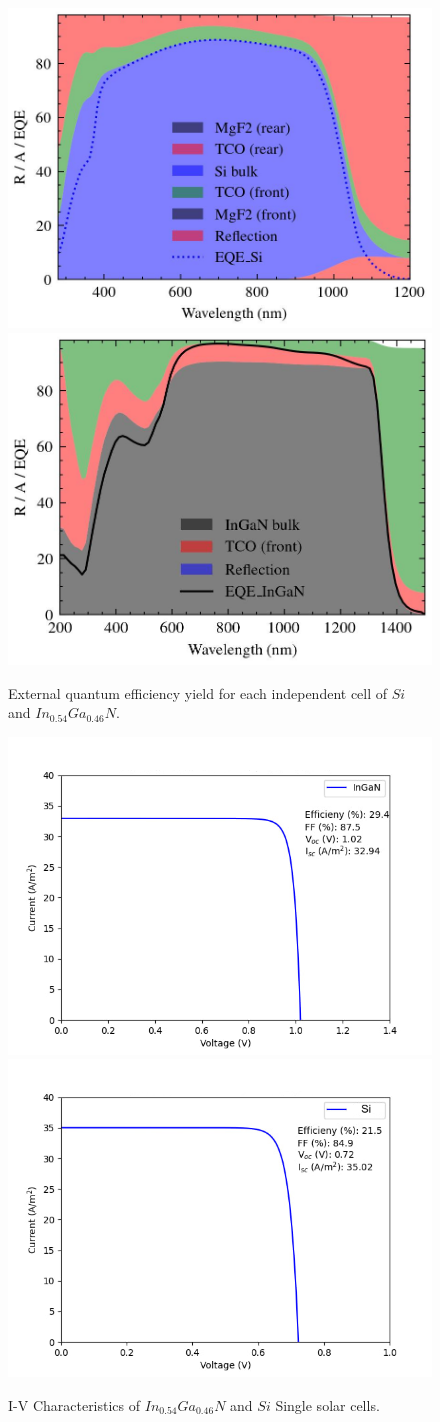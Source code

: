 \documentclass[preprint,12pt]{elsarticle}
\begin{document}
\begin{figure}[]
\centering
\includegraphics[width=0.45\linewidth, height=0.3\textheight]{Figure/EQE_Si.jpg}
\includegraphics[width=0.45\linewidth, height=0.3\textheight]{Figure/EQE_InGaN.jpg}
\caption{External quantum efficiency yield for each independent cell of $Si$ and $In_{0.54}Ga_{0.46}N$.}
\label{fig:EQE}
\end{figure}





\begin{figure}[]
	\centering
	\includegraphics[width=0.45\linewidth,
	height=0.25\textheight]{Figure/IV_InGaN}
	\includegraphics[width=0.45\linewidth, height=0.25\textheight]{Figure/IV_Si}
	\caption{I-V Characteristics of $In_{0.54}Ga_{0.46}N$ and $Si$ Single solar cells.}
	\label{fig:iv}
\end{figure}
\end{document}
